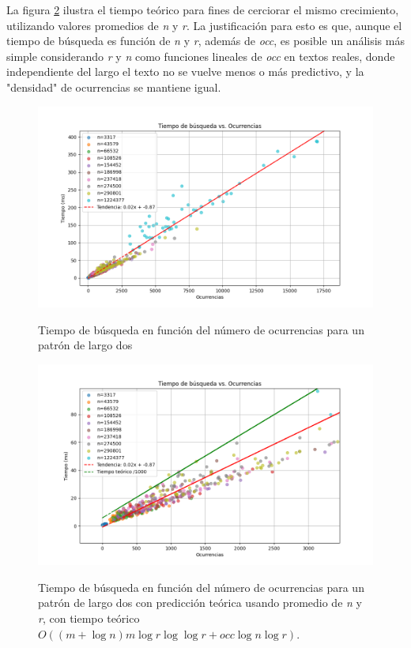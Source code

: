 La figura \ref{fig:timeoccsprediction} ilustra el tiempo teórico para fines de cerciorar el mismo crecimiento, utilizando valores promedios de \textit{n} y \textit{r}. La justificación para esto es que, aunque el tiempo de búsqueda es función de \textit{n} y \textit{r}, además de \textit{occ}, es posible un análisis más simple considerando \textit{r} y \textit{n} como funciones lineales de \textit{occ} en textos reales, donde independiente del largo el texto no se vuelve menos o más predictivo, y la "densidad" de ocurrencias se mantiene igual. 

\begin{figure}[h!]
    \centering
    \captionsetup{position=above} %
    \caption{Tiempo de búsqueda en función del número de ocurrencias para un patrón de largo dos}
    \includegraphics[width=1\textwidth]{imagenes/Time_Fixed_Pattern.png} %
    \label{fig:timeoccs}
\end{figure}

\begin{figure}[h!]
    \centering
    \captionsetup{position=above} %
    \caption{Tiempo de búsqueda en función del número de ocurrencias para un patrón de largo dos con predicción teórica usando promedio de \textit{n} y \textit{r}, con tiempo teórico 
    $ O( (m + \log{n}) m \log{r} \log {\log {r}} + occ \log{n} \log {r} ) $.}
    \includegraphics[width=1\textwidth]{imagenes/TIME_SEARCH_ZOOM.png} %
    \label{fig:timeoccsprediction}
\end{figure}


